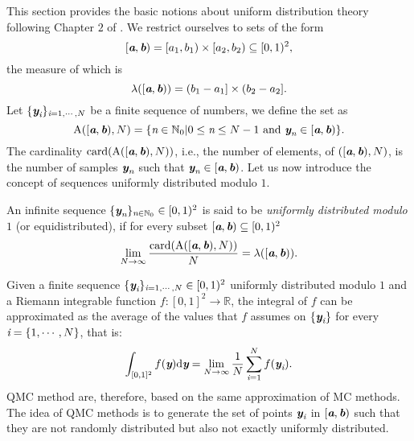 This section provides the basic notions about uniform distribution theory following Chapter $2$ of \cite{leobacher2014introduction}. 
We restrict ourselves to sets of the form $$[\textit{\textbf{a}}, \textit{\textbf{b}})= [a_1,b_1)\times[a_2, b_2)\subseteq[0,1)^2,$$ the measure of which is 
$$\lambda([\textit{\textbf{a}},\textit{\textbf{b}})) =(b_1-a_1]\times (b_2-a_2].$$
Let $\{\textit{\textbf{y}}_{\textit{i}}\}_{\textit{i}=1, \cdots, N}$ be a finite sequence of numbers, we define the set  as
\begin{equation}
\mbox{$\textup{A}$}([\textit{\textbf{a}},\textit{\textbf{b}}), N) = \{\textit{n}\in \mathbb{N}_0 | 0\leq\textit{n}\leq N-1 \mbox{ and } \textit{\textbf{y}}_{\textit{n}}\in [\textit{\textbf{a}},\textit{\textbf{b}})\}.
\end{equation}
The cardinality $\textrm{card}(\insieme{A}([\vect{a},\vect{b}), N))$, i.e., the number of elements, of $([\textit{\textbf{a}},\textit{\textbf{b}}), N)$, is the number of samples $\textit{\textbf{y}}_{\textit{n}}$ such that $\textit{\textbf{y}}_{\textit{n}}\in [\textit{\textbf{a}},\textit{\textbf{b}})$.
Let us now introduce the concept of sequences uniformly distributed modulo $1$.
\begin{definition}
An infinite sequence $\{\textit{\textbf{y}}_{\textit{n}}\}_{\textit{n}\in\mathbb{N}_0} \in [0,1)^2$ is said to be \textit{uniformly distributed modulo $1$} (or equidistributed), if for every subset $[\textit{\textbf{a}},\textit{\textbf{b}})\subseteq[0,1)^2$
\begin{equation}
\lim_{N\rightarrow \infty}\frac{\textrm{card}(\mbox{$\textup{A}$}([\textit{\textbf{a}},\textit{\textbf{b}}), N))}{N} = \lambda([\textit{\textbf{a}},\textit{\textbf{b}})).
\end{equation}
\end{definition}
Given a finite sequence $\{\textit{\textbf{y}}_{\textit{i}}\}_{\textit{i} = 1, \cdots, N}\in[0,1)^2$ uniformly distributed modulo $1$ and a 
Riemann integrable function $f:[0,1]^2\rightarrow \mathbb{R}$, the integral of $f$ can be approximated as the average of the values that $f$ assumes on $\{\textit{\textbf{y}}_{\textit{i}}\}$ for every $\textit{i}=\{1, \cdots, N\}$, that is:
\begin{equation}
 \int_{[0,1]^2}f(\textit{\textbf{y}})\textrm{d}\textit{\textbf{y}} = \lim_{N\rightarrow \infty}\frac{1}{N}\sum_{\textit{i}=1}^{N}f(\textit{\textbf{y}}_{\textit{i}}).
\end{equation}
QMC method are, therefore, based on the same approximation of MC methods.
The idea of QMC methods is to generate the set of points $\textit{\textbf{y}}_{\textit{i}}$ in $[\textit{\textbf{a}},\textit{\textbf{b}})$ such that they are not randomly distributed but also not exactly uniformly distributed. 
